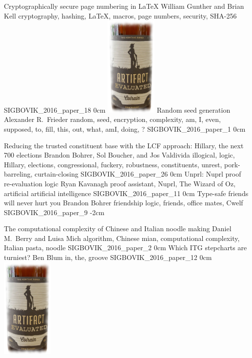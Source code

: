 
\addpaper
	{Cryptographically secure page numbering in \LaTeX}
	{William Gunther and Brian Kell}
	{cryptography, hashing, LaTeX, macros, page numbers, security, SHA-256}
	{SIGBOVIK_2016_paper_18}
	{0cm}
	{\includegraphics[width=1in]{eval}}
\addpaper
	{Random seed generation}
	{Alexander R.\ Frieder}
	{random, seed, encryption, complexity, am, I, even, supposed, to, fill, this, out, what, amI, doing, ?}
	{SIGBOVIK_2016_paper_1}
	{0cm}
	{}

\addpaper
	{Reducing the trusted constituent base with the LCF approach: Hillary, the next 700 elections}
	{Brandon Bohrer, Sol Boucher, and Jos Valdivida}
	{illogical, logic, Hillary, elections, congressional, fuckery, robustness, constituents, unrest, pork-barreling, curtain-closing}
	{SIGBOVIK_2016_paper_26}
	{0cm}
	{}
\addpaper
	{Unprl: Nuprl proof re-evaluation logic}
	{Ryan Kavanagh}
	{proof assistant, Nuprl, The Wizard of Oz, artificial artificial intelligence}
	{SIGBOVIK_2016_paper_11}
	{0cm}
	{}
\addpaper
	{Type-safe friends will never hurt you}
	{Brandon Bohrer}
	{friendship logic, friends, office mates, Cwelf}
	{SIGBOVIK_2016_paper_9}
	{-2cm}
	{}

\addpaper
	{The computational complexity of Chinese and Italian noodle making}
	{Daniel M.\ Berry and Luisa Mich}
	{algorithm, Chinese mian, computational complexity, Italian pasta, noodle}
	{SIGBOVIK_2016_paper_2}
	{0cm}
	{}
\addpaper
	{Which ITG stepcharts are turniest?}
	{Ben Blum}
	{in, the, groove}
	{SIGBOVIK_2016_paper_12}
	{0cm}
	{\includegraphics[width=1in]{eval}}


